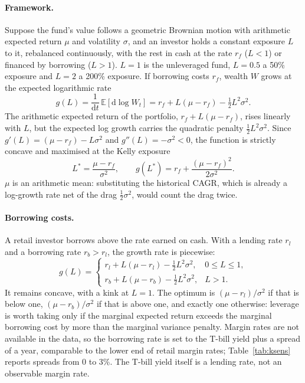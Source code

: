 \documentclass[11pt,a4paper]{article}
\begin{document}
\paragraph{Framework.} Suppose the fund's value follows a geometric Brownian motion with arithmetic expected return $\mu$ and volatility $\sigma$, and an investor holds a constant exposure $L$ to it, rebalanced continuously, with the rest in cash at the rate $r_f$ ($L<1$) or financed by borrowing ($L>1$). $L=1$ is the unleveraged fund, $L=0.5$ a 50\% exposure and $L=2$ a 200\% exposure. If borrowing costs $r_f$, wealth $W$ grows at the expected logarithmic rate
\[
g(L) = \frac{1}{\mathrm{d}t}\,\mathbb{E}\left[\mathrm{d}\log W_t\right] = r_f + L(\mu - r_f) - \tfrac{1}{2}L^2\sigma^2 .
\]
The arithmetic expected return of the portfolio, $r_f + L(\mu - r_f)$, rises linearly with $L$, but the expected log growth carries the quadratic penalty $\tfrac{1}{2}L^2\sigma^2$. Since $g'(L) = (\mu - r_f) - L\sigma^2$ and $g''(L) = -\sigma^2 < 0$, the function is strictly concave and maximised at the Kelly exposure \citep{kelly1956,breiman1961,merton1969}
\[
L^* = \frac{\mu - r_f}{\sigma^2}, \qquad g(L^*) = r_f + \frac{(\mu - r_f)^2}{2\sigma^2}.
\]
$\mu$ is an arithmetic mean: substituting the historical CAGR, which is already a log-growth rate net of the drag $\tfrac12\sigma^2$, would count the drag twice.

\paragraph{Borrowing costs.} A retail investor borrows above the rate earned on cash. With a lending rate $r_l$ and a borrowing rate $r_b > r_l$, the growth rate is piecewise:
\[
g(L) = \begin{cases} r_l + L(\mu - r_l) - \tfrac12 L^2\sigma^2, & 0 \le L \le 1,\\[2pt] r_b + L(\mu - r_b) - \tfrac12 L^2\sigma^2, & L > 1. \end{cases}
\]
It remains concave, with a kink at $L=1$. The optimum is $(\mu - r_l)/\sigma^2$ if that is below one, $(\mu - r_b)/\sigma^2$ if that is above one, and exactly one otherwise: leverage is worth taking only if the marginal expected return exceeds the marginal borrowing cost by more than the marginal variance penalty. Margin rates are not available in the data, so the borrowing rate is set to the T-bill yield plus a spread of  a year, comparable to the lower end of retail margin rates; Table~\ref{tab:ksens} reports spreads from 0 to 3\%. The T-bill yield itself is a lending rate, not an observable margin rate.
\end{document}
